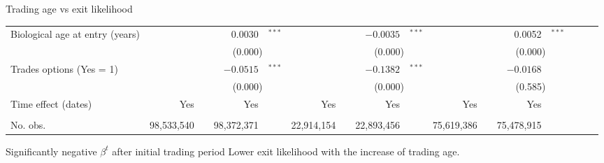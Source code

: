 \documentclass{beamer}
\begin{document}
\begin{frame}[shrink=10]{Trading age vs exit likelihood}
\begin{table}[h!]
\begin{tabular}{@{}l@{}r@{}lr@{}lr@{}lr@{}lr@{}lr@{}lr@{}l@{}l@{}}
	Biological age at entry (years) &       &       & 0.0030 & $^{***}$   &       &       & $-0.0035$ & $^{***}$   &       &       & 0.0052 & $^{***}$ \\
	& \multicolumn{2}{c}{} & \multicolumn{2}{c}{(0.000)} & \multicolumn{2}{c}{} & \multicolumn{2}{c}{(0.000)} & \multicolumn{2}{c}{} & \multicolumn{2}{c}{(0.000)} \\
	Trades options (Yes = 1) &       &       & $-0.0515$ & $^{***}$   &       &       & $-0.1382$ & $^{***}$   &       &       & $-0.0168$ &  \\
	& \multicolumn{2}{c}{} & \multicolumn{2}{c}{(0.000)} & \multicolumn{2}{c}{} & \multicolumn{2}{c}{(0.000)} & \multicolumn{2}{c}{} & \multicolumn{2}{c}{(0.585)} \\
	Time effect (dates) & Yes   &       & Yes   &       & Yes   &       & Yes   &       & Yes   &       & Yes   &  \\
	&       &       &       &       &       &       &       &       &       &  \\
	No. obs.   &    98,533,540  &       &    98,372,371  &       &   22,914,154  &       &   22,893,456  &       &   75,619,386  &       &   75,478,915  &  \\
	\bottomrule
\end{tabular}
		\label{tab:regressrank}
	\end{table}%

\begin{block}{Significantly negative $\beta^t$ after initial trading period}
Lower exit likelihood with the increase of trading age.
\end{block}

\end{frame}
\end{document}
